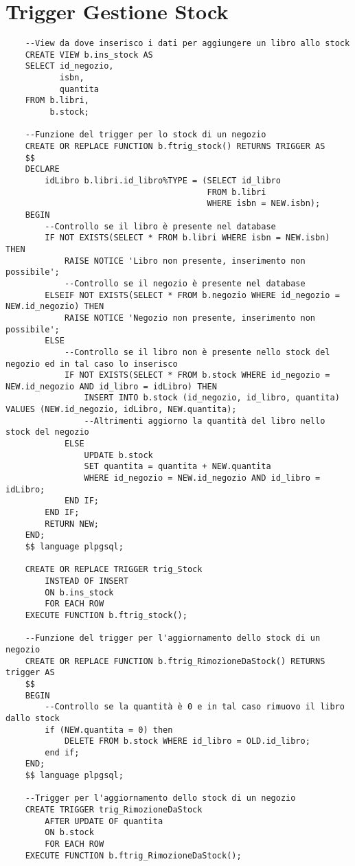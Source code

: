 \section{Trigger Gestione Stock}
\begin{lstlisting}
    --View da dove inserisco i dati per aggiungere un libro allo stock
    CREATE VIEW b.ins_stock AS
    SELECT id_negozio,
           isbn,
           quantita
    FROM b.libri,
         b.stock;
    
    --Funzione del trigger per lo stock di un negozio
    CREATE OR REPLACE FUNCTION b.ftrig_stock() RETURNS TRIGGER AS
    $$
    DECLARE
        idLibro b.libri.id_libro%TYPE = (SELECT id_libro
                                         FROM b.libri
                                         WHERE isbn = NEW.isbn);
    BEGIN
        --Controllo se il libro è presente nel database
        IF NOT EXISTS(SELECT * FROM b.libri WHERE isbn = NEW.isbn) THEN
            RAISE NOTICE 'Libro non presente, inserimento non possibile';
            --Controllo se il negozio è presente nel database
        ELSEIF NOT EXISTS(SELECT * FROM b.negozio WHERE id_negozio = NEW.id_negozio) THEN
            RAISE NOTICE 'Negozio non presente, inserimento non possibile';
        ELSE
            --Controllo se il libro non è presente nello stock del negozio ed in tal caso lo inserisco
            IF NOT EXISTS(SELECT * FROM b.stock WHERE id_negozio = NEW.id_negozio AND id_libro = idLibro) THEN
                INSERT INTO b.stock (id_negozio, id_libro, quantita) VALUES (NEW.id_negozio, idLibro, NEW.quantita);
                --Altrimenti aggiorno la quantità del libro nello stock del negozio
            ELSE
                UPDATE b.stock
                SET quantita = quantita + NEW.quantita
                WHERE id_negozio = NEW.id_negozio AND id_libro = idLibro;
            END IF;
        END IF;
        RETURN NEW;
    END;
    $$ language plpgsql;
    
    CREATE OR REPLACE TRIGGER trig_Stock
        INSTEAD OF INSERT
        ON b.ins_stock
        FOR EACH ROW
    EXECUTE FUNCTION b.ftrig_stock();
    
    --Funzione del trigger per l'aggiornamento dello stock di un negozio
    CREATE OR REPLACE FUNCTION b.ftrig_RimozioneDaStock() RETURNS trigger AS
    $$
    BEGIN
        --Controllo se la quantità è 0 e in tal caso rimuovo il libro dallo stock
        if (NEW.quantita = 0) then
            DELETE FROM b.stock WHERE id_libro = OLD.id_libro;
        end if;
    END;
    $$ language plpgsql;
    
    --Trigger per l'aggiornamento dello stock di un negozio
    CREATE TRIGGER trig_RimozioneDaStock
        AFTER UPDATE OF quantita
        ON b.stock
        FOR EACH ROW
    EXECUTE FUNCTION b.ftrig_RimozioneDaStock();
\end{lstlisting}
